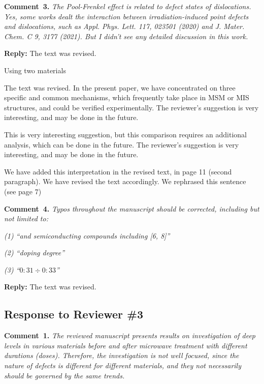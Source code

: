 \documentclass[10pt]{iopart}
\begin{document}
\vspace{1cm}
\noindent
\textcolor[rgb]{0.00,0.50,1.00}{\textbf{Comment~3.}}
\emph{The Pool-Frenkel effect is related to defect states of dislocations.
Yes, some works dealt the interaction between irradiation-induced point defects and dislocations,
such as Appl. Phys. Lett. 117, 023501 (2020) and J. Mater. Chem. C 9, 3177 (2021).
But I didn’t see any detailed discussion in this work.}

\noindent
\textcolor[rgb]{0.51,0.00,0.00}{\textbf{Reply:}}
The text was revised.

\cite{LightNeuIrrad:1,LightNeuIrrad:2,SiC:bookCh17}



Using two materials



The text was revised.
In the present paper, we have concentrated on three specific and
common mechanisms, which frequently take place in MSM or MIS structures, and could be
verified experimentally. The reviewer’s suggestion is very interesting, and may be done in the
future.

This is very interesting suggestion, but this comparison requires an additional analysis,
which can be done in the future.
The reviewer’s suggestion is very interesting, and may be done in the
future.

We have added this interpretation in the revised text, in page 11 (second paragraph).
We have revised the text accordingly.
We rephrased this sentence (see page 7)

\vspace{1cm}
\noindent
\textcolor[rgb]{0.00,0.50,1.00}{\textbf{Comment~4.}}
\emph{Typos throughout the manuscript should be corrected, including but not limited to:}

\emph{(1) ``and semiconducting compounds including [6, 8]''}

\emph{(2) ``doping degree''}

\emph{(3) ``$0:31\div0:33$''}

\noindent
\textcolor[rgb]{0.51,0.00,0.00}{\textbf{Reply:}}
The text was revised.


\subsection*{Response to Reviewer \#3 }
\noindent
\textcolor[rgb]{0.00,0.50,1.00}{\textbf{Comment~1.}}
\emph{The reviewed manuscript presents results on investigation of deep levels
in various materials before and after microwave treatment with different durations (doses).
Therefore, the investigation is not well focused, since the nature of defects is different
for different materials, and they not necessarily should be governed by the same trends. }
\end{document}
